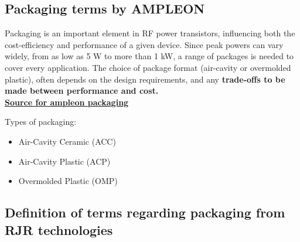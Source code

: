 


\subsection{Packaging terms by AMPLEON}

Packaging is an important element in RF power transistors, influencing both the cost-efficiency and performance of a given device. Since peak powers can vary widely, from as low as 5 W to more than 1 kW, a range of packages is needed to cover every application. The choice of package format (air-cavity or overmolded plastic), often depends on the design requirements, and any \textbf{trade-offs to be made between performance and cost.} \\

\href{https://www.ampleon.com/packages.html}{\textbf{Source for ampleon packaging}}

Types of packaging:

\begin{itemize}
	\item Air-Cavity Ceramic (ACC)
	\item Air-Cavity Plastic (ACP)
	\item Overmolded Plastic (OMP)
\end{itemize}

\subsection{Definition of terms regarding packaging from RJR technologies}

